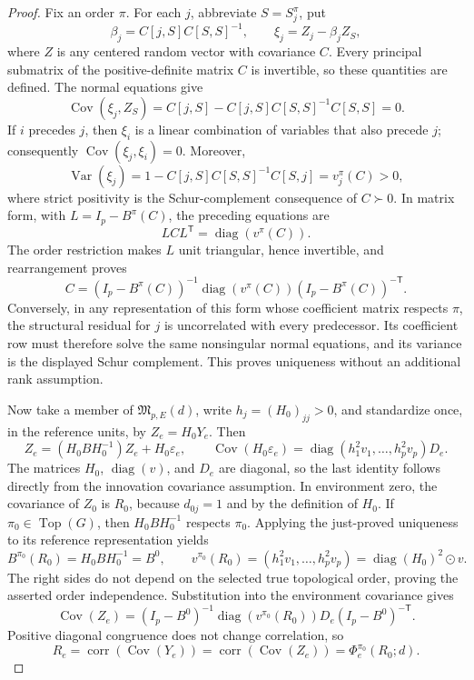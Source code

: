 \documentclass{article}
\begin{document}
\begin{proof}
Fix an order \(\pi\).  For each \(j\), abbreviate \(S=S_j^\pi\), put
\[
 \beta_j=C[j,S]C[S,S]^{-1},\qquad
 \xi_j=Z_j-\beta_j Z_S,
\]
where \(Z\) is any centered random vector with covariance \(C\).  Every principal submatrix of the positive-definite matrix \(C\) is invertible, so these quantities are defined.  The normal equations give
\[
 \operatorname{Cov}(\xi_j,Z_S)
 =C[j,S]-C[j,S]C[S,S]^{-1}C[S,S]=0.
\]
If \(i\) precedes \(j\), then \(\xi_i\) is a linear combination of variables that also precede \(j\); consequently \(\operatorname{Cov}(\xi_j,\xi_i)=0\).  Moreover,
\[
 \operatorname{Var}(\xi_j)
 =1-C[j,S]C[S,S]^{-1}C[S,j]=v_j^\pi(C)>0,
\]
where strict positivity is the Schur-complement consequence of \(C\succ0\).  In matrix form, with \(L=I_p-B^\pi(C)\), the preceding equations are
\[
 LCL^{\mathsf T}=\operatorname{diag}(v^\pi(C)).
\]
The order restriction makes \(L\) unit triangular, hence invertible, and rearrangement proves
\[
 C=(I_p-B^\pi(C))^{-1}\operatorname{diag}(v^\pi(C))(I_p-B^\pi(C))^{-\mathsf T}.
\]
Conversely, in any representation of this form whose coefficient matrix respects \(\pi\), the structural residual for \(j\) is uncorrelated with every predecessor.  Its coefficient row must therefore solve the same nonsingular normal equations, and its variance is the displayed Schur complement.  This proves uniqueness without an additional rank assumption.

Now take a member of \(\mathfrak M_{p,E}(d)\), write \(h_j=(H_0)_{jj}>0\), and standardize once, in the reference units, by \(Z_e=H_0Y_e\).  Then
\[
 Z_e=(H_0BH_0^{-1})Z_e+H_0\varepsilon_e,
 \qquad
 \operatorname{Cov}(H_0\varepsilon_e)
 =\operatorname{diag}(h_1^2v_1,\ldots,h_p^2v_p)D_e.
\]
The matrices \(H_0\), \(\operatorname{diag}(v)\), and \(D_e\) are diagonal, so the last identity follows directly from the innovation covariance assumption.  In environment zero, the covariance of \(Z_0\) is \(R_0\), because \(d_{0j}=1\) and by the definition of \(H_0\).  If \(\pi_0\in\operatorname{Top}(G)\), then \(H_0BH_0^{-1}\) respects \(\pi_0\).  Applying the just-proved uniqueness to its reference representation yields
\[
 B^{\pi_0}(R_0)=H_0BH_0^{-1}=B^0,
 \qquad
 v^{\pi_0}(R_0)=(h_1^2v_1,\ldots,h_p^2v_p)
 =\operatorname{diag}(H_0)^2\odot v.
\]
The right sides do not depend on the selected true topological order, proving the asserted order independence.  Substitution into the environment covariance gives
\[
 \operatorname{Cov}(Z_e)
 =(I_p-B^0)^{-1}\operatorname{diag}(v^{\pi_0}(R_0))D_e
 (I_p-B^0)^{-\mathsf T}.
\]
Positive diagonal congruence does not change correlation, so
\[
 R_e=\operatorname{corr}(\operatorname{Cov}(Y_e))
 =\operatorname{corr}(\operatorname{Cov}(Z_e))
 =\Phi_e^{\pi_0}(R_0;d).
\]


\end{proof}
\end{document}

